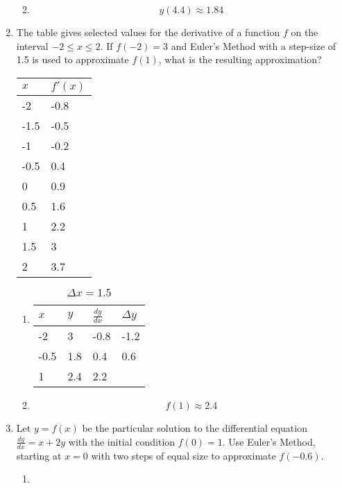 \documentclass[12pt]{article}
\begin{document}
\begin{enumerate}
\begin{enumerate}
\begin{table}[h]
\end{table}
\item $$y(4.4)\approx 1.84$$
\end{enumerate}
\item The table gives selected values for the derivative of a function $f$ on the interval $-2\leq x \leq 2$. If $f(-2)=3$ and Euler's Method with a step-size of 1.5 is used to approximate $f(1)$, what is the resulting approximation?
\begin{table}[h]
\centering
\begin{tabular}{|l|l|}
\hline
$x$  & $f'(x)$ \\ \hline
-2   & -0.8    \\ \hline
-1.5 & -0.5    \\ \hline
-1   & -0.2    \\ \hline
-0.5 & 0.4     \\ \hline
0    & 0.9     \\ \hline
0.5  & 1.6     \\ \hline
1    & 2.2     \\ \hline
1.5  & 3       \\ \hline
2    & 3.7     \\ \hline
\end{tabular}
\end{table}
\begin{enumerate}
    \item 

\begin{table}[h]
\caption{$\Delta x = 1.5$}
\centering \label{table_example}
\begin{tabular}{l|lll}
$x$ & \multicolumn{1}{l|}{$y$} & \multicolumn{1}{l|}{$\frac{dy}{dx}$} & $\Delta y$ \\ \hline
-2 & 3 & -0.8 & -1.2 \\
-0.5 & 1.8 & 0.4 & 0.6 \\
1 & 2.4 & 2.2 & 
\end{tabular}
\end{table}
\item $$f(1)\approx 2.4$$
\end{enumerate}

\item Let $y=f(x)$ be the particular solution to the differential equation $\frac{dy}{dx}=x+2y$ with the initial condition $f(0)=1$. Use Euler's Method, starting at $x=0$ with two steps of equal size to approximate $f(-0.6)$.

\begin{enumerate}
    \item 


\end{enumerate}
\end{enumerate}
\end{document}
